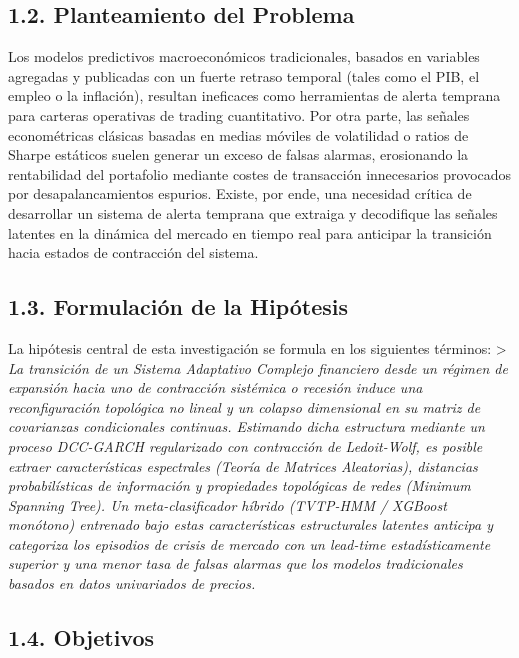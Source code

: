 \documentclass[
  12pt,
]{article}
\begin{document}
\subsection{1.2. Planteamiento del
Problema}\label{planteamiento-del-problema}

Los modelos predictivos macroeconómicos tradicionales, basados en
variables agregadas y publicadas con un fuerte retraso temporal (tales
como el PIB, el empleo o la inflación), resultan ineficaces como
herramientas de alerta temprana para carteras operativas de trading
cuantitativo. Por otra parte, las señales econométricas clásicas basadas
en medias móviles de volatilidad o ratios de Sharpe estáticos suelen
generar un exceso de falsas alarmas, erosionando la rentabilidad del
portafolio mediante costes de transacción innecesarios provocados por
desapalancamientos espurios. Existe, por ende, una necesidad crítica de
desarrollar un sistema de alerta temprana que extraiga y decodifique las
señales latentes en la dinámica del mercado en tiempo real para
anticipar la transición hacia estados de contracción del sistema.

\subsection{1.3. Formulación de la
Hipótesis}\label{formulaciuxf3n-de-la-hipuxf3tesis}

La hipótesis central de esta investigación se formula en los siguientes
términos: \textgreater{} \emph{La transición de un Sistema Adaptativo
Complejo financiero desde un régimen de expansión hacia uno de
contracción sistémica o recesión induce una reconfiguración topológica
no lineal y un colapso dimensional en su matriz de covarianzas
condicionales continuas. Estimando dicha estructura mediante un proceso
DCC-GARCH regularizado con contracción de Ledoit-Wolf, es posible
extraer características espectrales (Teoría de Matrices Aleatorias),
distancias probabilísticas de información y propiedades topológicas de
redes (Minimum Spanning Tree). Un meta-clasificador híbrido (TVTP-HMM /
XGBoost monótono) entrenado bajo estas características estructurales
latentes anticipa y categoriza los episodios de crisis de mercado con un
lead-time estadísticamente superior y una menor tasa de falsas alarmas
que los modelos tradicionales basados en datos univariados de precios.}

\subsection{1.4. Objetivos}\label{objetivos}
\end{document}
